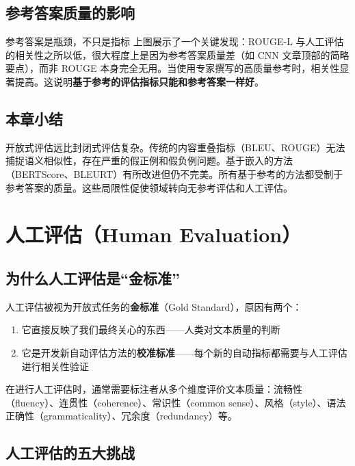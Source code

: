 \documentclass[a4paper]{article}
\begin{document}
\subsection{参考答案质量的影响}





\begin{importantbox}{参考答案是瓶颈，不只是指标}
上图展示了一个关键发现：ROUGE-L 与人工评估的相关性之所以低，很大程度上是因为参考答案质量差（如 CNN 文章顶部的简略要点），而非 ROUGE 本身完全无用。当使用专家撰写的高质量参考时，相关性显著提高。这说明\textbf{基于参考的评估指标只能和参考答案一样好}。
\end{importantbox}

\subsection{本章小结}

开放式评估远比封闭式评估复杂。传统的内容重叠指标（BLEU、ROUGE）无法捕捉语义相似性，存在严重的假正例和假负例问题。基于嵌入的方法（BERTScore、BLEURT）有所改进但仍不完美。所有基于参考的方法都受制于参考答案的质量。这些局限性促使领域转向无参考评估和人工评估。


\section{人工评估（Human Evaluation）}

\subsection{为什么人工评估是``金标准''}

人工评估被视为开放式任务的\textbf{金标准}（Gold Standard），原因有两个：
\begin{enumerate}
    \item 它直接反映了我们最终关心的东西——人类对文本质量的判断
    \item 它是开发新自动评估方法的\textbf{校准标准}——每个新的自动指标都需要与人工评估进行相关性验证
\end{enumerate}

在进行人工评估时，通常需要标注者从多个维度评价文本质量：流畅性（fluency）、连贯性（coherence）、常识性（common sense）、风格（style）、语法正确性（grammaticality）、冗余度（redundancy）等。

\subsection{人工评估的五大挑战}
\end{document}
